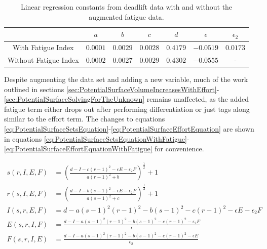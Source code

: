 \begin{table}[h]
    \centering
    \begin{tabular}{c|c|c|c|c|c|c}
         & $a$ & $b$ & $c$ & $d$ & $\epsilon$ & $\epsilon_2$ \\
         \hline
        With Fatigue Index & $0.0001$ & $0.0029$ & $0.0028$ & $0.4179$ & $-0.0519$ & $0.0173$ \\
        Without Fatigue Index & $0.0002$ & $0.0027$ & $0.0029$ & $0.4302$ & $-0.0555$ & - \\
    \end{tabular}
    \caption{Linear regression constants from deadlift data with and without the augmented fatigue data.}
    \label{tab:LinearRegressionConstantsWithFatigue}
\end{table}

Despite augmenting the data set and adding a new variable, much of the work outlined in sections \ref{sec:PotentialSurfaceVolumeIncreasesWithEffort}-\ref{sec:PotentialSurfaceSolvingForTheUnknown} remains unaffected, as the added fatigue term either drops out after performing differentiation or just tags along similar to the effort term. The changes to equations \ref{eq:PotentialSurfaceSetsEquation}-\ref{eq:PotentialSurfaceEffortEquation} are shown in equations \ref{eq:PotentialSurfaceSetsEquationWithFatigue}-\ref{eq:PotentialSurfaceEffortEquationWithFatigue} for convenience.

\begin{subequations}
    \begin{align}
        s(r,I,E,F)&=
        \left( 
            \frac{
                d-I-c(r-1)^2-\epsilon E-\epsilon_2 F
            }{
                a(r-1)^2+b
            }
        \right)^\frac{1}{2}+1
        \label{eq:PotentialSurfaceSetsEquationWithFatigue}\\
        r(s,I,E,F)&=
        \left(
            \frac{
                d-I-b(s-1)^2-\epsilon E-\epsilon_2 F
            }{
                a(s-1)^2+c
            }
        \right)^\frac{1}{2}+1
        \label{eq:PotentialSurfaceRepsEquationWithFatigue}\\
        I(s,r,E,F)&=
        d-a(s-1)^2(r-1)^2-b(s-1)^2-c(r-1)^2-\epsilon E-\epsilon_2 F
        \label{eq:PotentialSurfaceIntensityEquationWithFatigue}\\
        E(s,r,I,F)&=
        \frac{
            d-I-a(s-1)^2(r-1)^2-b(s-1)^2-c(r-1)^2-\epsilon_2 F
        }{
            \epsilon
        }
        \label{eq:PotentialSurfaceEffortEquationWithFatigue}\\
        F(s,r,I,E)&=
        \frac{
            d-I-a(s-1)^2(r-1)^2-b(s-1)^2-c(r-1)^2 -\epsilon E
        }{
            \epsilon_2
        }
        \label{eq:PotentialSurfaceFatigueEquation}
    \end{align}
\end{subequations}

